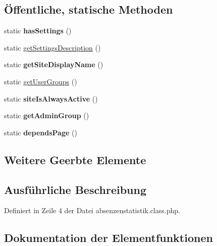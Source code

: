 \subsection*{Öffentliche, statische Methoden}
\begin{DoxyCompactItemize}
\item 
\mbox{\label{classabsenzenstatistik_a9aa4556349be3509272f23864f33db7c}} 
static {\bfseries has\+Settings} ()
\item 
static \mbox{\hyperlink{classabsenzenstatistik_a7d9b3903ab79b78a0bb6ce8ff3f44790}{get\+Settings\+Description}} ()
\item 
\mbox{\label{classabsenzenstatistik_ae78d9e2242179fee105df848a0d5c2e8}} 
static {\bfseries get\+Site\+Display\+Name} ()
\item 
static \mbox{\hyperlink{classabsenzenstatistik_a05f364fa3136d72fe1e88e2a03348b66}{get\+User\+Groups}} ()
\item 
\mbox{\label{classabsenzenstatistik_abeef367be5445c6d0c754e2c9a5801a2}} 
static {\bfseries site\+Is\+Always\+Active} ()
\item 
\mbox{\label{classabsenzenstatistik_a74f4ccf8496f4a61adf3d7080d0419fc}} 
static {\bfseries get\+Admin\+Group} ()
\item 
\mbox{\label{classabsenzenstatistik_acac24702aee0497671d0e5b91f2a3cd4}} 
static {\bfseries depends\+Page} ()
\end{DoxyCompactItemize}
\subsection*{Weitere Geerbte Elemente}


\subsection{Ausführliche Beschreibung}


Definiert in Zeile 4 der Datei absenzenstatistik.\+class.\+php.



\subsection{Dokumentation der Elementfunktionen}
\mbox{\label{classabsenzenstatistik_a7d9b3903ab79b78a0bb6ce8ff3f44790}} 

